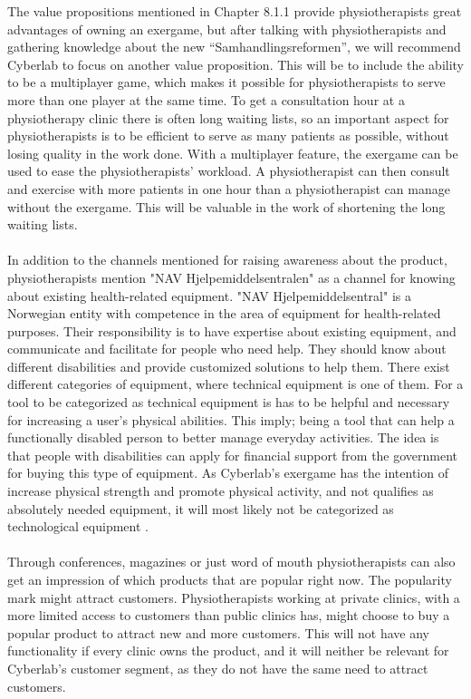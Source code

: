 The value propositions mentioned in Chapter 8.1.1 provide physiotherapists great advantages of owning an exergame, but after talking with physiotherapists and gathering knowledge about the new “Samhandlingsreformen”, we will recommend Cyberlab to focus on another value proposition. This will be to include the ability to be a multiplayer game, which makes it possible for physiotherapists to serve more than one player at the same time. To get a consultation hour at a physiotherapy clinic there is often long waiting lists, so an important aspect for physiotherapists is to be efficient to serve as many patients as possible, without losing quality in the work done. With a multiplayer feature, the exergame can be used to ease the physiotherapists’ workload. A physiotherapist can then consult and exercise with more patients in one hour than a physiotherapist can manage without the exergame. This will be valuable in the work of shortening the long waiting lists. \\ \\
In addition to the channels mentioned for raising awareness about the product, physiotherapists mention "NAV Hjelpemiddelsentralen" as a channel for knowing about existing health-related equipment. "NAV Hjelpemiddelsentral" is a Norwegian entity with competence in the area of equipment for health-related purposes. Their responsibility is to have expertise about existing equipment, and communicate and facilitate for people who need help. They should know about different disabilities and provide customized solutions to help them. There exist different categories of equipment, where technical equipment is one of them. For a tool to be categorized as technical equipment is has to be helpful and necessary for increasing a user’s physical abilities. This imply; being a tool that can help a functionally disabled person to better manage everyday activities. The idea is that people with disabilities can apply for financial support from the government for buying this type of equipment. As Cyberlab’s exergame has the intention of increase physical strength and promote physical activity, and not qualifies as absolutely needed equipment, it will most likely not be categorized as technological equipment \cite{navhjelpemiddel} \cite{navhjelpemiddelsentralen}.  \\ \\ 
Through conferences, magazines or just word of mouth physiotherapists can also get an impression of which products that are popular right now. The popularity mark might attract customers. Physiotherapists working at private clinics, with a more limited access to customers than public clinics has, might choose to buy a popular product to attract new and more customers. This will not have any functionality if every clinic owns the product, and it will neither be relevant for Cyberlab’s customer segment, as they do not have the same need to attract customers. \\ \\ 
